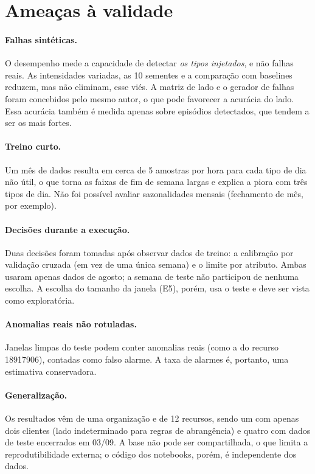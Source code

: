 \documentclass[sigconf,nonacm]{acmart}
\begin{document}
\section{Ameaças à validade}\label{sec:ameacas}

\paragraph{Falhas sintéticas.} O desempenho mede a capacidade de detectar \emph{os tipos injetados}, e não falhas reais. As intensidades variadas, as 10 sementes e a comparação com baselines reduzem, mas não eliminam, esse viés. A matriz de lado e o gerador de falhas foram concebidos pelo mesmo autor, o que pode favorecer a acurácia do lado. Essa acurácia também é medida apenas sobre episódios detectados, que tendem a ser os mais fortes.

\paragraph{Treino curto.} Um mês de dados resulta em cerca de 5 amostras por hora para cada tipo de dia não útil, o que torna as faixas de fim de semana largas e explica a piora com três tipos de dia. Não foi possível avaliar sazonalidades mensais (fechamento de mês, por exemplo).

\paragraph{Decisões durante a execução.} Duas decisões foram tomadas após observar dados de treino: a calibração por validação cruzada (em vez de uma única semana) e o limite por atributo. Ambas usaram apenas dados de agosto; a semana de teste não participou de nenhuma escolha. A escolha do tamanho da janela (E5), porém, usa o teste e deve ser vista como exploratória.

\paragraph{Anomalias reais não rotuladas.} Janelas limpas do teste podem conter anomalias reais (como a do recurso 18917906), contadas como falso alarme. A taxa de alarmes é, portanto, uma estimativa conservadora.

\paragraph{Generalização.} Os resultados vêm de uma organização e de 12 recursos, sendo um com apenas dois clientes (lado indeterminado para regras de abrangência) e quatro com dados de teste encerrados em 03/09. A base não pode ser compartilhada, o que limita a reprodutibilidade externa; o código dos notebooks, porém, é independente dos dados.
\end{document}
